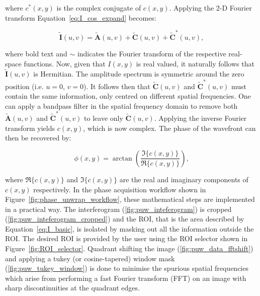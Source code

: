 where $c^{*}(x,y)$ is the complex conjugate of $c(x,y)$. Applying the 2-D Fourier transform Equation~\ref{eq:I_cos_expand} becomes:

\begin{equation}\label{eq:I_fourier}
\tilde{\boldsymbol{I}}(u,v) = \tilde{\boldsymbol{A}}(u,v) + \tilde{\boldsymbol{C}}(u,v) + \tilde{\boldsymbol{C}}^{*}(u,v),
\end{equation}

where bold text and $\sim$ indicates the Fourier transform of the respective real-space functions. Now, given that $I(x,y)$ is real valued, it naturally follows that $\tilde{\boldsymbol{I}}(u,v)$ is Hermitian. The amplitude spectrum is symmetric around the zero position (i.e. $u = 0$, $v = 0$). It follows then that $\tilde{\boldsymbol{C}}(u,v)$ and $\tilde{\boldsymbol{C}}^{*}(u,v)$ must contain the same information, only centred on different spatial frequencies. One can apply a bandpass filter in the spatial frequency domain to remove both $\tilde{\boldsymbol{A}}(u,v)$ and $\tilde{\boldsymbol{C}}^{*}(u,v)$ to leave only $\tilde{\boldsymbol{C}}(u,v)$\cite{lewis1993absolute}. Applying the inverse Fourier transform yields $c(x,y)$, which is now complex. The phase of the wavefront can then be recovered by:

\begin{equation}\label{eq:phase}
\phi(x,y) = \arctan\left(\frac{\Im\{c(x,y)\}}{\Re\{c(x,y)\}}\right),
\end{equation}

where $\Re\{c(x,y)\}$ and $\Im\{c(x,y)\}$ are the real and imaginary components of $c(x,y)$ respectively. In the phase acquisition workflow shown in Figure~\ref{fig:phase_unwrap_workflow}, these mathematical steps are implemented in a practical way. The interferogram (\ref{fig:puw_inteferogram}) is cropped (\ref{fig:puw_inteferogram_cropped}) and the ROI, that is the area described by Equation~\ref{eq:I_basic}, is isolated by masking out all the information outside the ROI. The desired ROI is provided by the user using the ROI selector shown in Figure~\ref{fig:ROI_selector}. Quadrant shifting the image (\ref{fig:puw_data_fftshift}) and applying a tukey (or cosine-tapered) window mask (\ref{fig:puw_tukey_window}) is done to minimise the spurious spatial frequencies which arise from performing a fast Fourier transform (FFT) on an image with sharp discontinuities at the quadrant edges.

